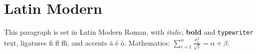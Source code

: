 \documentclass{article}
\begin{document}
\section{Latin Modern}
This paragraph is set in Latin Modern Roman, with \emph{italic}, \textbf{bold}
and \texttt{typewriter} text, ligatures fi fl ffi, and accents \"a \'e \`o.
Mathematics: $\sum_{i=1}^{n} \frac{x_i^2}{\sqrt{i}} = \alpha + \beta$.
\end{document}
